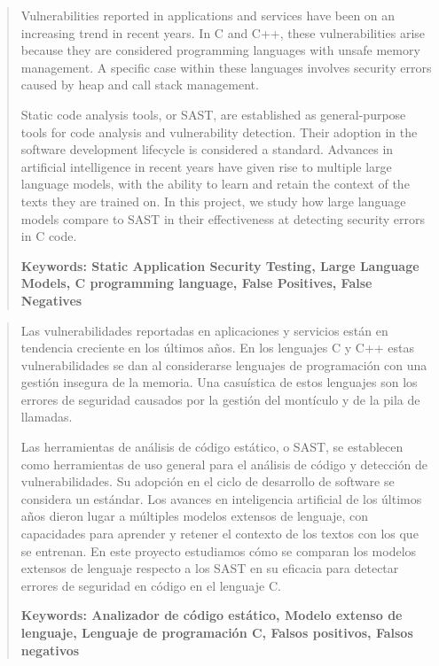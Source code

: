 \documentclass[12pt, a4paper, twoside]{article}
\begin{document}

\cleardoublepage

\begin{abstract}
	Vulnerabilities reported in applications and services have been on an increasing trend in recent years. In C and C++, these vulnerabilities arise because they are considered programming languages with unsafe memory management. A specific case within these languages involves security errors caused by heap and call stack management.
	
	Static code analysis tools, or SAST, are established as general-purpose tools for code analysis and vulnerability detection. Their adoption in the software development lifecycle is considered a standard. Advances in artificial intelligence in recent years have given rise to multiple large language models, with the ability to learn and retain the context of the texts they are trained on. In this project, we study how large language models compare to SAST in their effectiveness at detecting security errors in C code.
	
	\bfseries{\large{Keywords:}} Static Application Security Testing, Large Language Models, C programming language, False Positives, False Negatives
\end{abstract}

\newpage

\begin{abstract}
	Las vulnerabilidades reportadas en aplicaciones y servicios están en tendencia creciente en los últimos años. En los lenguajes C y C++ estas vulnerabilidades se dan al considerarse lenguajes de programación con una gestión insegura de la memoria. Una casuística de estos lenguajes son los errores de seguridad causados por la gestión del montículo y de la pila de llamadas.
	
	Las herramientas de análisis de código estático, o SAST, se establecen como herramientas de uso general para el análisis de código y detección de vulnerabilidades. Su adopción en el ciclo de desarrollo de software se considera un estándar.
	Los avances en inteligencia artificial de los últimos años dieron lugar a múltiples modelos extensos de lenguaje, con capacidades para aprender y retener el contexto de los textos con los que se entrenan. En este proyecto estudiamos cómo se comparan los modelos extensos de lenguaje respecto a los SAST en su eficacia para detectar errores de seguridad en código en el lenguaje C.
	
	\bfseries{\large{Keywords:}} Analizador de código estático, Modelo extenso de lenguaje, Lenguaje de programación C, Falsos positivos, Falsos negativos
\end{abstract}
\end{document}
